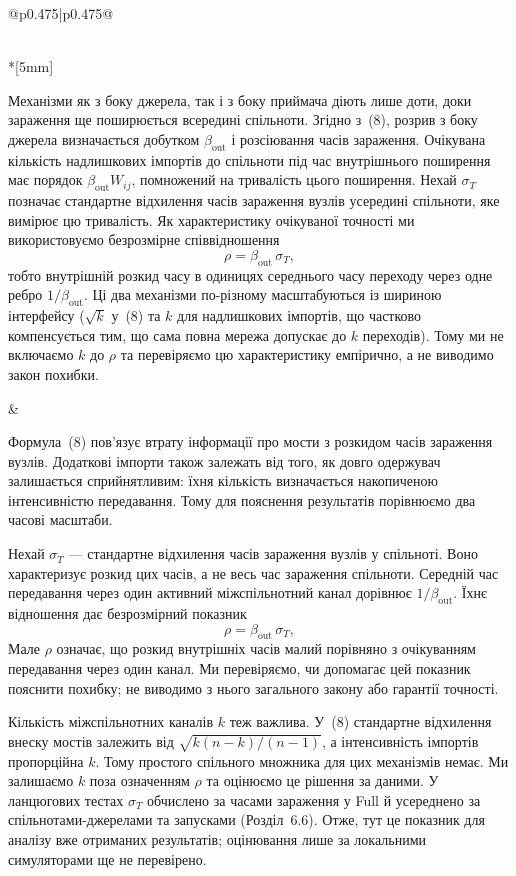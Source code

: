 \documentclass[11pt]{article}
\newcommand{\Full}{\textnormal{Full}}
\begin{document}
\begin{longtable}{@{}p{0.475\textwidth}|p{0.475\textwidth}@{}}
\begin{minipage}[t]{\linewidth}
\end{minipage} \\*[5mm]
\begin{minipage}[t]{\linewidth}
Механізми як з боку джерела, так і з боку приймача діють лише доти, доки зараження ще поширюється всередині спільноти. Згідно з~(8), розрив з боку джерела визначається добутком $\beta_{\mathrm{out}}$ і розсіювання часів зараження. Очікувана кількість надлишкових імпортів до спільноти під час внутрішнього поширення має порядок $\beta_{\mathrm{out}}W_{ij}$, помножений на тривалість цього поширення. Нехай $\sigma_T$ позначає стандартне відхилення часів зараження вузлів усередині спільноти, яке вимірює цю тривалість. Як характеристику очікуваної точності ми використовуємо безрозмірне співвідношення
\begin{equation*}\rho=\beta_{\mathrm{out}}\,\sigma_T,\tag{10}
\end{equation*}
тобто внутрішній розкид часу в одиницях середнього часу переходу через одне ребро $1/\beta_{\mathrm{out}}$. Ці два механізми по-різному масштабуються із шириною інтерфейсу ($\sqrt{k}$ у~(8) та $k$ для надлишкових імпортів, що частково компенсується тим, що сама повна мережа допускає до $k$ переходів). Тому ми не включаємо $k$ до $\rho$ та перевіряємо цю характеристику емпірично, а не виводимо закон похибки.
\end{minipage} &
\begin{minipage}[t]{\linewidth}
Формула~(8) пов'язує втрату інформації про мости з розкидом часів зараження вузлів. Додаткові імпорти також залежать від того, як довго одержувач залишається сприйнятливим: їхня кількість визначається накопиченою інтенсивністю передавання. Тому для пояснення результатів порівнюємо два часові масштаби.
\par Нехай $\sigma_T$ --- стандартне відхилення часів зараження вузлів у спільноті. Воно характеризує розкид цих часів, а не весь час зараження спільноти. Середній час передавання через один активний міжспільнотний канал дорівнює $1/\beta_{\mathrm{out}}$. Їхнє відношення дає безрозмірний показник
\begin{equation*}\rho=\beta_{\mathrm{out}}\,\sigma_T,\tag{10}
\end{equation*}
Мале $\rho$ означає, що розкид внутрішніх часів малий порівняно з очікуванням передавання через один канал. Ми перевіряємо, чи допомагає цей показник пояснити похибку; не виводимо з нього загального закону або гарантії точності.
\par Кількість міжспільнотних каналів $k$ теж важлива. У~(8) стандартне відхилення внеску мостів залежить від $\sqrt{k(n-k)/(n-1)}$, а інтенсивність імпортів пропорційна $k$. Тому простого спільного множника для цих механізмів немає. Ми залишаємо $k$ поза означенням $\rho$ та оцінюємо це рішення за даними. У ланцюгових тестах $\sigma_T$ обчислено за часами зараження у \Full{} й усереднено за спільнотами-джерелами та запусками (Розділ~6.6). Отже, тут це показник для аналізу вже отриманих результатів; оцінювання лише за локальними симуляторами ще не перевірено.

\end{minipage}
\end{longtable}
\end{document}
